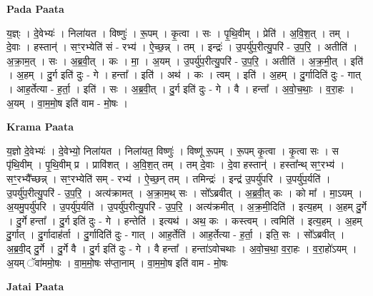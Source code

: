 \documentclass[17pt]{extarticle}
\begin{document}
\textbf{Pada Paata} \newline

य॒ज्ञ्ः । दे॒वेभ्यः॑ । निला॑यत । विष्णुः॑ । रू॒पम् । कृ॒त्वा । सः । पृ॒थि॒वीम् । प्रेति॑ । अ॒वि॒श॒त् । तम् । दे॒वाः । हस्तान्॑ । सꣳ॒॒रभ्येति॑ सं - रभ्य॑ । ऐ॒च्छ॒न्न् । तम् । इन्द्रः॑ । उ॒पर्यु॑प॒रीत्यु॒परि॑ - उ॒प॒रि॒ । अतीति॑ । अ॒क्रा॒म॒त् । सः । अ॒ब्र॒वी॒त् । कः । मा॒ । अ॒यम् । उ॒पर्यु॑प॒रीत्यु॒परि॑ - उ॒प॒रि॒ । अतीति॑ । अ॒क्र॒मी॒त् । इति॑ । अ॒हम् । दु॒र्ग इति॑ दुः - गे । हन्ता᳚ । इति॑ । अथ॑ । कः । त्वम् । इति॑ । अ॒हम् । दु॒र्गादिति॑ दुः - गात् । आह॒र्तेत्या - ह॒र्ता॒ । इति॑ । सः । अ॒ब्र॒वी॒त् । दु॒र्ग इति॑ दुः - गे । वै । हन्ता᳚ । अ॒वो॒च॒थाः॒ । व॒रा॒हः । अ॒यम् । वा॒म॒मो॒ष इति॑ वाम - मो॒षः ।  \newline


\textbf{Krama Paata} \newline

य॒ज्ञो दे॒वेभ्यः॑ । दे॒वेभ्यो॒ निला॑यत । निला॑यत॒ विष्णुः॑ । विष्णू॑ रू॒पम् । रू॒पम् कृ॒त्वा । कृ॒त्वा सः । स पृ॑थि॒वीम् । पृ॒थि॒वीम् प्र । प्रावि॑शत् । अ॒वि॒श॒त् तम् । तम् दे॒वाः । दे॒वा हस्तान्॑ । हस्ता᳚न्थ् सꣳ॒॒रभ्य॑ । सꣳ॒॒रभ्यै᳚च्छन्न् । सꣳ॒॒रभ्येति॑ सम् - रभ्य॑ । ऐ॒च्छ॒न् तम् । तमिन्द्रः॑ । इन्द्र॑ उ॒पर्यु॑परि । उ॒पर्यु॑प॒र्यति॑ । उ॒पर्यु॑प॒रीत्यु॒परि॑ - उ॒प॒रि॒ । अत्य॑क्रामत् । अ॒क्रा॒म॒थ् सः । सो᳚ऽब्रवीत् । अ॒ब्र॒वी॒त् कः । को मा᳚ । मा॒ऽयम् । अ॒यमु॒पर्यु॑परि । उ॒पर्यु॑प॒र्यति॑ । उ॒पर्यु॑प॒रीत्यु॒परि॑ - उ॒प॒रि॒ । अत्य॑क्रमीत् । अ॒क्र॒मी॒दिति॑ । इत्य॒हम् । अ॒हम् दु॒र्गे । दु॒र्गे हन्ता᳚ । दु॒र्ग इति॑ दुः - गे । हन्तेति॑ । इत्यथ॑ । अथ॒ कः । कस्त्वम् । त्वमिति॑ । इत्य॒हम् । अ॒हम् दु॒र्गात् । दु॒र्गादाह॑र्ता । दु॒र्गादिति॑ दुः - गात् । आह॒र्तेति॑ । आह॒र्तेत्या - ह॒र्ता॒ । इति॒ सः । सो᳚ऽब्रवीत् । अ॒ब्र॒वी॒द् दु॒र्गे । दु॒र्गे वै । दु॒र्ग इति॑ दुः - गे । वै हन्ता᳚ । हन्ता॑ऽवोचथाः । अ॒वो॒च॒था॒ व॒रा॒हः । व॒रा॒हो॑ऽयम् । अ॒यम् ॅवा॑ममो॒षः । वा॒म॒मो॒षः स॑प्ता॒नाम् । वा॒म॒मो॒ष इति॑ वाम - मो॒षः \newline

\textbf{Jatai Paata} \newline
\end{document}
